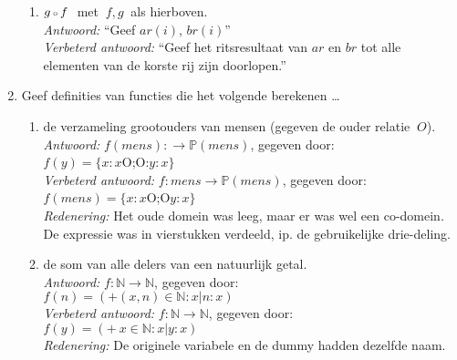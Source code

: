 \begin{enumerate}
\begin{enumerate}
    \item $g {\scriptstyle{\:\circ}\:} f~$ met $~f,g~$ als hierboven. \\
        \emph{Antwoord:} ``Geef $ar(i)$, $br(i)$'' \\
        \emph{Verbeterd antwoord:} ``Geef het ritsresultaat van $ar$ en $br$ tot alle elementen van de korste rij zijn doorlopen.'' \\

\end{enumerate}

\item Geef definities van functies die het volgende berekenen \ldots
\begin{enumerate}

    \item de verzameling grootouders van mensen (gegeven de ouder relatie $~O$). \\
        \emph{Antwoord:} $f(mens) :  \rightarrow \mathbb{P}(mens)$, gegeven door: \\
            $f(y)=\{x: x$O;O:$y: x\}$ \\
            \emph{Verbeterd antwoord:} $f : mens  \rightarrow \mathbb{P}(mens)$,
gegeven door: \\
$f(mens)=\{x: x$O;O$y: x\}$ \\
                \emph{Redenering:} Het oude domein was leeg, maar er was wel een co-domein. De expressie was in vierstukken verdeeld, ip. de gebruikelijke drie-deling.\\

    \item de som van alle delers van een natuurlijk getal. \\
        \emph{Antwoord:} $f: \mathbb{N} \rightarrow \mathbb{N}$, gegeven door: \\
            $f(n) = (+ (x, n) \in \mathbb{N} : x | n : x )$ \\
       \emph{Verbeterd antwoord:} $f: \mathbb{N} \rightarrow \mathbb{N}$, gegeven door: \\
$f(y) = (+~ x \in \mathbb{N} : x | y : x )$ \\
                \emph{Redenering:} De originele variabele en de dummy hadden dezelfde naam.



\end{enumerate}
\end{enumerate}
